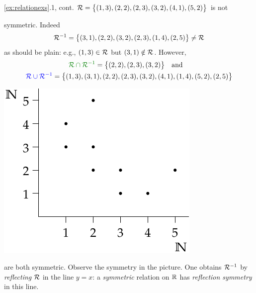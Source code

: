 \begin{example*}{\ref{ex:relationexs}.1, cont.}{}
	$\mathcal{R}=\bigl\{(1,3),(2,2),(2,3),(3,2),(4,1),(5,2)\bigr\}$ is not\par
	\begin{minipage}[t]{0.75\linewidth}\vspace{-8pt}
		symmetric. Indeed
		\[
			\mathcal{R}^{-1}=\bigl\{(3,1),(2,2),(3,2),(2,3),(1,4),(2,5)\bigr\} \neq \mathcal{R}
		\]
		as should be plain: e.g., $(1,3)\in\mathcal{R}$ but $(3,1)\notin\mathcal{R}$. However,
		\begin{gather*}
			\textcolor{Green}{\cR\cap \cR^{-1}}=\bigl\{(2,2), (2,3), (3,2)\bigr\}\quad\text{and}\quad \\
			\textcolor{blue}{\cR\cup \cR^{-1}}=\bigl\{(1,3),(3,1),(2,2),(2,3),(3,2),(4,1),(1,4),(5,2),(2,5)\bigr\}
		\end{gather*}
	\end{minipage}
	\hfill
	\begin{minipage}[t]{0.24\linewidth}\vspace{-20pt}
		\hfill
		\includegraphics{relations-04-relnun}
	\end{minipage}
	\medbreak
	are both symmetric.	Observe the symmetry in the picture. One obtains $\mathcal{R}^{-1}$ by \emph{reflecting\footnotemark} $\mathcal{R}$ in the line $y=x$: a \emph{symmetric} relation on $\mathbb{R}$ has \emph{reflection symmetry} in this line.
\end{example*}

\vspace{-10pt}


\goodbreak


